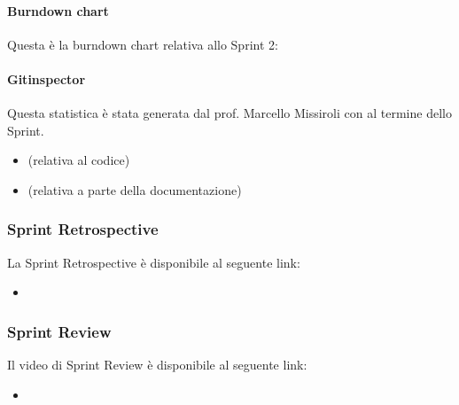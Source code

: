 \documentclass[letterpaper,10pt,italian]{sphinxmanual}
\begin{document}
\paragraph{Burndown chart}
\label{\detokenize{development/sprint2/index:burndown-chart}}
\sphinxAtStartPar
Questa è la burndown chart relativa allo Sprint 2:

\noindent{}


\paragraph{Gitinspector}
\label{\detokenize{development/sprint2/index:gitinspector}}
\sphinxAtStartPar
Questa statistica è stata generata dal prof. Marcello Missiroli con
 al termine dello Sprint.
\begin{itemize}
\item {} 
\sphinxAtStartPar
{} (relativa al codice)

\item {} 
\sphinxAtStartPar
{} (relativa a parte della documentazione)

\end{itemize}


\subsubsection{Sprint Retrospective}
\label{\detokenize{development/sprint2/index:sprint-retrospective}}
\sphinxAtStartPar
La Sprint Retrospective è disponibile al seguente link:
\begin{itemize}
\item {} 
\sphinxAtStartPar
{}

\end{itemize}


\subsubsection{Sprint Review}
\label{\detokenize{development/sprint2/index:sprint-review}}
\sphinxAtStartPar
Il video di Sprint Review è disponibile al seguente link:
\begin{itemize}
\item {} 
\sphinxAtStartPar
{}

\end{itemize}
\end{document}
